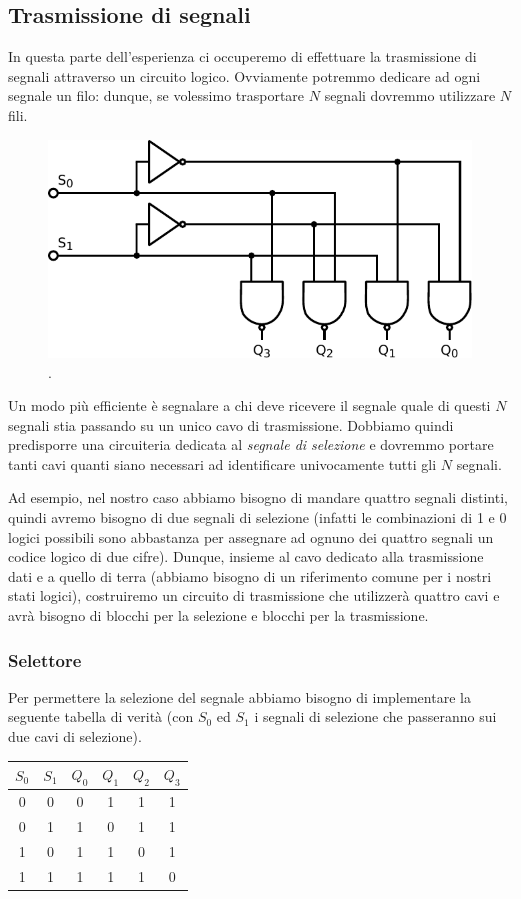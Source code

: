 \subsection{Trasmissione di segnali}

In questa parte dell'esperienza ci occuperemo di effettuare la trasmissione di segnali attraverso un circuito logico. Ovviamente potremmo dedicare ad ogni segnale un filo: dunque, se volessimo trasportare $N$ segnali dovremmo utilizzare $N$ fili.

\begin{figure}
\centering
\includegraphics[width=.35\textwidth]{../E10/latex/selector.pdf}
\caption{.}
\label{cir10:selector}
\end{figure}

Un modo più efficiente è segnalare a chi deve ricevere il segnale quale di questi $N$ segnali stia passando su un unico cavo di trasmissione. Dobbiamo quindi predisporre una circuiteria dedicata al \textit{segnale di selezione} e dovremmo portare tanti cavi quanti siano necessari ad identificare univocamente tutti gli $N$ segnali.

Ad esempio, nel nostro caso abbiamo bisogno di mandare quattro segnali distinti, quindi avremo bisogno di due segnali di selezione (infatti le combinazioni di 1 e 0 logici possibili sono abbastanza per assegnare ad ognuno dei quattro segnali un codice logico di due cifre). Dunque, insieme al cavo dedicato alla trasmissione dati e a quello di terra (abbiamo bisogno di un riferimento comune per i nostri stati logici), costruiremo un circuito di trasmissione che utilizzerà quattro cavi e avrà bisogno di blocchi per la selezione e blocchi per la trasmissione.

\subsubsection{Selettore}

Per permettere la selezione del segnale abbiamo bisogno di implementare la seguente tabella di verità (con $S_0$ ed $S_1$ i segnali di selezione che passeranno sui due cavi di selezione).

\begin{table}[htpc]
\centering
{\renewcommand{\arraystretch}{1.1}%
\begin{tabular}{|c|c|c|c|c|c|}
\hline
$S_0$ & $S_1$ & $Q_0$ & $Q_1$ & $Q_2$ & $Q_3$ \\
\hline
0 & 0 & 0 & 1 & 1 & 1\\
\hline
0 & 1 & 1 & 0 & 1 & 1\\
\hline
1 & 0 & 1 & 1 & 0 & 1\\
\hline
1 & 1 & 1 & 1 & 1 & 0\\
\hline
\end{tabular}}
\label{tab10:multiplx_selezione}
\end{table}

